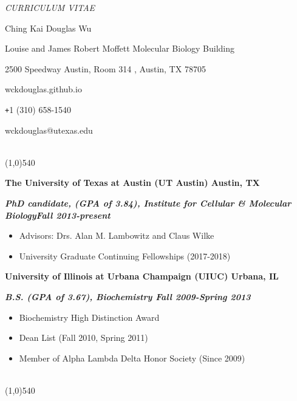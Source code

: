 \documentclass[dvips,11pt]{article}
\begin{document}
\centerline{\it \small CURRICULUM VITAE}
\vspace{2mm}
\centerline{\Large Ching Kai Douglas Wu}
\centerline{ Louise and James Robert Moffett Molecular Biology Building}
\centerline{2500 Speedway Austin, Room 314 , Austin, TX 78705}
\centerline{wckdouglas.github.io}
\centerline{\texttt{+}1 (310) 658-1540}
\centerline{wckdouglas@utexas.edu}
\vspace{.5mm}

 \vspace{-2.5mm}
\\\noindent \line(1,0){540}\\
\noindent \centerline{\bf The University of Texas at Austin (UT Austin) \hfill Austin, TX}
\noindent \centerline{\textit{\textbf{PhD candidate, (GPA of 3.84), Institute for Cellular \& Molecular Biology\hfill Fall 2013-present}}}
\vspace{-6mm}
\begin{spacing}{0.1}
\begin{itemize} \parskip 0pt \parsep 0pt
	\setlength{\itemsep}{1pt}
	\item Advisors: Drs. Alan M. Lambowitz and Claus Wilke
	\item University Graduate Continuing Fellowships (2017-2018) 
	\end{itemize}
\end{spacing}
\vspace{4mm}
\noindent \centerline{\bf University of Illinois at Urbana Champaign (UIUC) \hfill Urbana, IL}
\noindent \centerline{{\textit{\textbf{B.S. (GPA of 3.67), Biochemistry \hfill Fall 2009-Spring 2013}}}}
\begin{spacing}{0.1}
\vspace{-2.5mm}
\begin{itemize} \itemsep 1pt \parskip 0pt \parsep 0pt
	\setlength{\itemsep}{0pt}
	\item Biochemistry High Distinction Award
	\item Dean List (Fall 2010, Spring 2011)
	\item Member of Alpha Lambda Delta Honor Society (Since 2009)
	\end{itemize}
\end{spacing}
\vspace{+4mm}

 \vspace{-2mm}
\\\noindent \line(1,0){540}\\
\vspace{-5mm}
\end{document}
